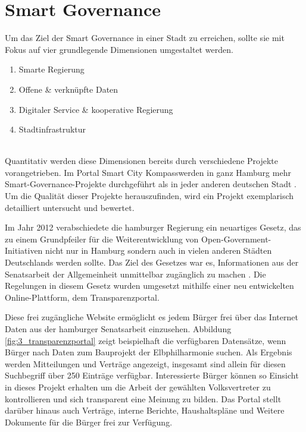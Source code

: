 \section{Smart Governance}
\label{sec:smart_governance}

Um das Ziel der Smart Governance in einer Stadt zu erreichen, sollte sie mit Fokus auf vier grundlegende Dimensionen umgestaltet werden.
\begin{enumerate}
	\item Smarte Regierung
	\item Offene \& verknüpfte Daten
	\item Digitaler Service \& kooperative Regierung
	\item Stadtinfrastruktur
\end{enumerate}
\autocite[14]{Fuetterer.2020}
\\ Quantitativ werden diese Dimensionen bereits durch verschiedene Projekte vorangetrieben. Im Portal \glqq Smart City Kompass\grqq\space werden in ganz Hamburg mehr Smart-Governance-Projekte durchgeführt als in jeder anderen deutschen Stadt \autocite{SmartCityKompass.2020}. Um die Qualität dieser Projekte herauszufinden, wird ein Projekt exemplarisch detailliert untersucht und bewertet.


Im Jahr 2012 verabschiedete die hamburger Regierung ein neuartiges Gesetz, das zu einem Grundpfeiler für die Weiterentwicklung von Open-Government-Initiativen nicht nur in Hamburg sondern auch in vielen anderen Städten Deutschlands werden sollte. Das Ziel des Gesetzes war es, Informationen aus der Senatsarbeit der Allgemeinheit unmittelbar zugänglich zu machen \autocite{Senat.2012}. Die Regelungen in diesem Gesetz wurden umgesetzt mithilfe einer neu entwickelten Online-Plattform, dem \glqq Transparenzportal\grqq \autocite[127]{Spil.2017}.


Diese frei zugängliche Website ermöglicht es jedem Bürger frei über das Internet Daten aus der hamburger Senatsarbeit einzusehen. Abbildung \ref{fig:3_transparenzportal} zeigt beispielhaft die verfügbaren Datensätze, wenn Bürger nach Daten zum Bauprojekt der Elbphilharmonie suchen. Als Ergebnis werden Mitteilungen und Verträge angezeigt, insgesamt sind allein für diesen Suchbegriff über 250 Einträge verfügbar. Interessierte Bürger können so Einsicht in dieses Projekt erhalten um die Arbeit der gewählten Volksvertreter zu kontrollieren und sich transparent eine Meinung zu bilden. Das Portal stellt darüber hinaus auch Verträge, interne Berichte, Haushaltspläne und Weitere Dokumente für die Bürger frei zur Verfügung.

